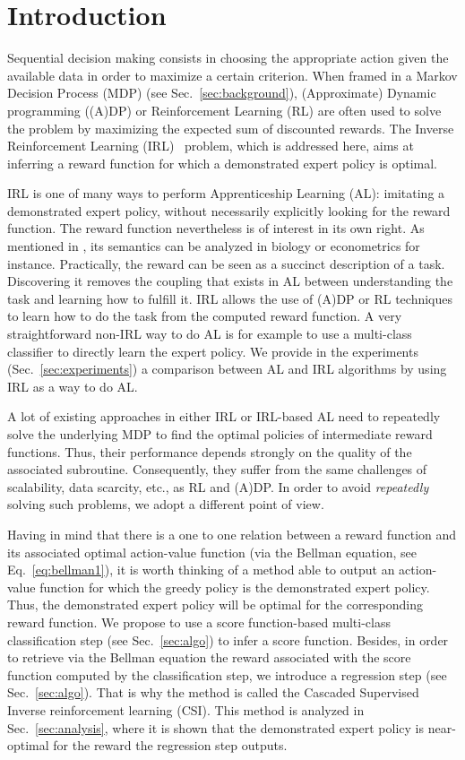 \documentclass{llncs}
\begin{document}
\section{Introduction}
\label{sec-2}
Sequential decision making consists in choosing the appropriate action given the available data in order to maximize a certain criterion. When framed in a Markov Decision Process (MDP) (see Sec.~\ref{sec:background}), (Approximate) Dynamic programming ((A)DP) or Reinforcement Learning (RL) are often used to solve the problem by maximizing the expected sum of discounted rewards. The Inverse Reinforcement Learning (IRL)~\cite{russell1998learning} problem, which is addressed here, aims at inferring a reward function for which a demonstrated expert policy is optimal.

IRL is one of many ways to perform Apprenticeship Learning (AL): imitating a demonstrated expert policy, without necessarily explicitly looking for the reward function. The reward function nevertheless is of interest in its own right. As mentioned in \cite{russell1998learning}, its semantics can be analyzed in biology or econometrics for instance. Practically, the reward can be seen as a succinct description of a task. Discovering it removes the coupling that exists in AL between understanding the task and learning how to fulfill it. IRL allows the use of (A)DP or RL techniques to learn how to do the task from the computed reward function. A very straightforward non-IRL way to do AL is for example to use a multi-class classifier to directly learn the expert policy. We provide in the experiments (Sec.~\ref{sec:experiments}) a comparison between AL and IRL algorithms by using IRL as a way to do AL.

A lot of existing approaches in either IRL or IRL-based AL need to repeatedly solve the underlying MDP to find the optimal policies of intermediate reward functions. Thus, their performance depends strongly on the quality of the associated subroutine. Consequently, they suffer from the same challenges of scalability, data scarcity, etc., as RL and (A)DP. In order to avoid \emph{repeatedly} solving such problems, we adopt a different point of view.

Having in mind that there is a one to one relation between a reward function and its associated optimal action-value function (via the Bellman equation, see Eq.~\eqref{eq:bellman1}), it is worth thinking of a method able to output an action-value function for which the greedy policy is the demonstrated expert policy. Thus, the demonstrated expert policy will be optimal for the corresponding reward function. We propose to use a score function-based multi-class classification step (see Sec.~\ref{sec:algo}) to infer a score function. Besides, in order to retrieve via the Bellman equation the reward associated with the score function computed by the classification step, we introduce a regression step (see Sec.~\ref{sec:algo}). That is why the method is called the Cascaded Supervised Inverse reinforcement learning (CSI). This method is analyzed in Sec.~\ref{sec:analysis}, where it is shown that the demonstrated expert policy is near-optimal for the reward the regression step outputs.
\end{document}
